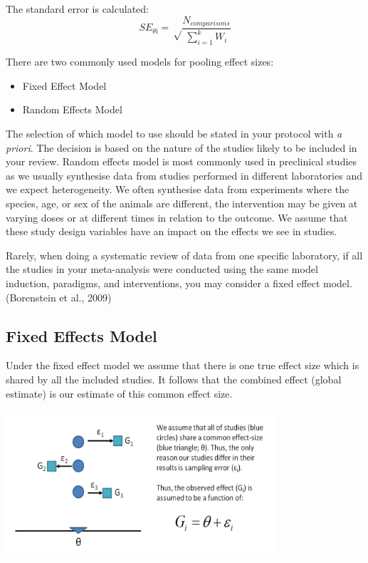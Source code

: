 \documentclass[
]{book}
\begin{document}
The standard error is calculated:
\[SE_{\theta\text{i}} = \sqrt \frac{N_{comparisons}}{\sum_{i=1}^{k} W_i} \]

There are two commonly used models for pooling effect sizes:

\begin{itemize}
\item
  Fixed Effect Model
\item
  Random Effects Model
\end{itemize}

The selection of which model to use should be stated in your protocol with \emph{a priori}. The decision is based on the nature of the studies likely to be included in your review. Random effects model is most commonly used in preclinical studies as we usually synthesise data from studies performed in different laboratories and we expect heterogeneity. We often synthesise data from experiments where the species, age, or sex of the animals are different, the intervention may be given at varying doses or at different times in relation to the outcome. We assume that these study design variables have an impact on the effects we see in studies.

Rarely, when doing a systematic review of data from one specific laboratory, if all the studies in your meta-analysis were conducted using the same model induction, paradigms, and interventions, you may consider a fixed effect model. (Borenstein et al., 2009)

\hypertarget{fixed-effects-model}{%
\subsection{Fixed Effects Model}\label{fixed-effects-model}}

Under the fixed effect model we assume that there is one true effect size which is shared by all the included studies. It follows that the combined effect (global estimate) is our estimate of this common effect size.

\includegraphics[width=0.75\textwidth,height=\textheight]{figs/fixedeffects.png}
\end{document}
